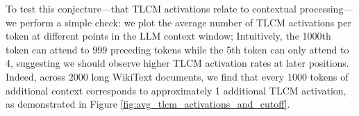 To test this conjecture---that TLCM activations relate to contextual processing---we perform a simple check: we plot the average number of TLCM activations per token at different points in the LLM context window; Intuitively, the 1000th token can attend to 999 preceding tokens while the 5th token can only attend to 4, suggesting we should observe higher TLCM activation rates at later positions. Indeed, across 2000 long WikiText documents, we find that every 1000 tokens of additional context corresponds to approximately 1 additional TLCM activation, as demonstrated in Figure \ref{fig:avg_tlcm_activations_and_cutoff}.






